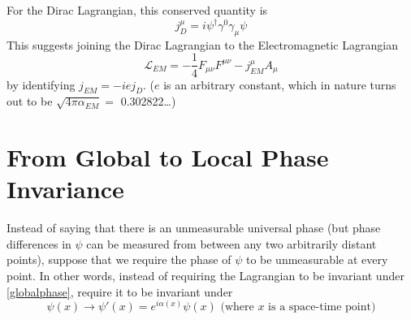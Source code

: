 \documentclass[12pt]{article}
\begin{document}
For the Dirac Lagrangian, this conserved quantity is
\begin{equation}
  j_D^\mu = i \psi^\dagger \gamma^0 \gamma_\mu \psi
\end{equation}
This suggests joining the Dirac Lagrangian to the Electromagnetic Lagrangian
\begin{equation}
  \mathcal{L}_{EM} = -\frac{1}{4}F_{\mu\nu}F^{\mu\nu} - j_{EM}^\mu A_\mu
\end{equation}
by identifying $j_{EM} = -i e j_D$.  ($e$ is an arbitrary constant, which
in nature turns out to be $\sqrt{4 \pi \alpha_{EM}} =$ 0.302822\ldots)

\section{From Global to Local Phase Invariance}

Instead of saying that there is an unmeasurable universal phase (but
phase differences in $\psi$ can be measured from between any two
arbitrarily distant points), suppose that we require the phase of
$\psi$ to be unmeasurable at every point.  In other words, instead of
requiring the Lagrangian to be invariant under \ref{globalphase},
require it to be invariant under
\begin{equation}
  \psi(x) \to \psi'(x) = e^{i \alpha(x)} \psi(x) \mbox{ (where $x$ is a space-time point)}
\end{equation}
\end{document}

